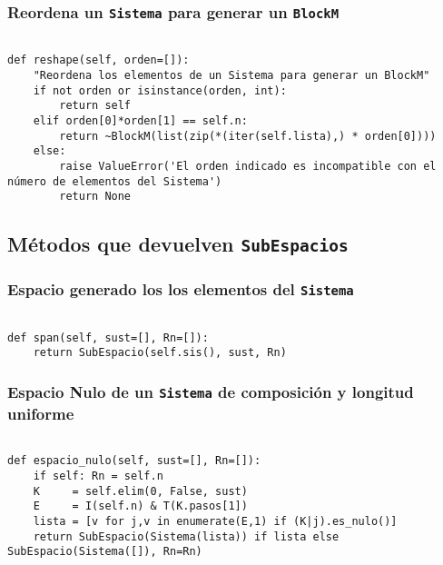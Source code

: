 \documentclass[11pt]{report}
\begin{document}
\subsubsection{Reordena un \texttt{Sistema} para generar un \texttt{BlockM}}
\label{sec:org1ed963f}
\begin{verbatim}
   
def reshape(self, orden=[]):
    "Reordena los elementos de un Sistema para generar un BlockM"
    if not orden or isinstance(orden, int):
        return self
    elif orden[0]*orden[1] == self.n:
        return ~BlockM(list(zip(*(iter(self.lista),) * orden[0])))
    else:
        raise ValueError('El orden indicado es incompatible con el número de elementos del Sistema')
        return None

\end{verbatim}

\subsection{Métodos que devuelven \texttt{SubEspacios}}
\label{sec:orgb1d9582}
\subsubsection{Espacio generado los los elementos del \texttt{Sistema}}
\label{sec:org69687df}

\begin{verbatim}

def span(self, sust=[], Rn=[]):
    return SubEspacio(self.sis(), sust, Rn)

\end{verbatim}

\subsubsection{Espacio Nulo de un \texttt{Sistema} de composición y longitud uniforme}
\label{sec:org88c6752}

\begin{verbatim}

def espacio_nulo(self, sust=[], Rn=[]):
    if self: Rn = self.n
    K     = self.elim(0, False, sust)
    E     = I(self.n) & T(K.pasos[1])
    lista = [v for j,v in enumerate(E,1) if (K|j).es_nulo()]
    return SubEspacio(Sistema(lista)) if lista else SubEspacio(Sistema([]), Rn=Rn)

\end{verbatim}
\end{document}
